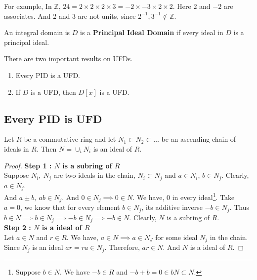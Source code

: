 For example, In $\mathbb{Z}$, $24 = 2 \times 2 \times 2 \times 3 = -2 \times -3 \times 2 \times 2$.
Here $2$ and $-2$ are associates.
And $2$ and $3$ are not units, since $2^{-1}, 3^{-1} \notin \mathbb{Z}$.

\begin{definition}[PID]
	An integral domain is $D$ is a \textbf{Principal Ideal Domain} if every ideal in $D$ is a principal ideal.
\end{definition}

There are two important results on UFDs.
\begin{enumerate}
	\item Every PID is a UFD.
	\item If $D$ is a UFD, then $D[x]$ is a UFD.
\end{enumerate}

\subsection{Every PID is UFD}
\begin{lemma}
	Let $R$ be a commutative ring and let $N_1 \subset N_2 \subset \dots $ be an ascending chain of ideals in $R$.
	Then $N = \cup_i N_i$ is an ideal of $R$.
\end{lemma}
\begin{proof}
	\textbf{Step 1 : $N$ is a subring of $R$}\\
	Suppose $N_i,\ N_j$ are two ideals in the chain, $N_i \subset N_j$ and $a \in N_i$, $b \in N_j$.
	Clearly, $a \in N_j$.\\

	And $a \pm b,\ ab \in N_j$.
	And $0 \in N_j \implies 0 \in N$.
	We have, $0$ in every ideal\dag\footnote{
		Suppose $b \in N$.
		We have $-b \in R$ and $-b+b = 0 \in bN \subset N$.}.
	Take $a = 0$, we know that for every element $b \in N_j$, its additive inverse $-b \in N_j$.
	Thus $b \in N \implies b \in N_j \implies -b \in N_j \implies -b \in N$.
	Clearly, $N$ is a subring of $R$.\\
	
	\textbf{Step 2 : $N$ is a ideal of $R$}\\
	Let $a \in N$ and $r \in R$.
	We have, $a \in N \implies a \in N_J$ for some ideal $N_j$ in the chain.
	Since $N_j$ is an ideal $ar = ra \in N_j$.
	Therefore, $ar \in N$.
	And $N$ is a ideal of $R$.
\end{proof}


